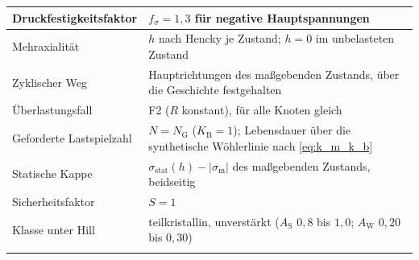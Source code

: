 \begin{table}[htbp]
\begin{tabular}{L{0.28\textwidth} L{0.64\textwidth}}
        \hline
        Druckfestigkeitsfaktor        & $f_{\sigma} = 1{,}3$ für negative Hauptspannungen                                                                                            \\
        \hline
        Mehraxialität                 & $h$ nach Hencky je Zustand; $h = 0$ im unbelasteten Zustand                                                                                  \\
        \hline
        Zyklischer Weg                & Hauptrichtungen des maßgebenden Zustands, über die Geschichte festgehalten                                                                   \\
        \hline
        Überlastungsfall              & F2 ($R$ konstant), für alle Knoten gleich                                                                                                    \\
        \hline
        Geforderte Lastspielzahl      & $N = N_{\mathrm{G}}$ ($K_{\mathrm{B}} = 1$); Lebensdauer über die synthetische Wöhlerlinie nach \eqref{eq:k_m_k_b}                           \\
        \hline
        Statische Kappe               & $\sigma_{\mathrm{stat}}(h) - |\sigma_{\mathrm{m}}|$ des maßgebenden Zustands, beidseitig                                                     \\
        \hline
        Sicherheitsfaktor             & $S = 1$                                                                                                                                      \\
        \hline
        Klasse unter Hill             & teilkristallin, unverstärkt ($A_{\mathrm{S}}$ $0{,}8$ bis $1{,}0$; $A_{\mathrm{W}}$ $0{,}20$ bis $0{,}30$)                                   \\
        \hline
    \end{tabular}
\end{table}


